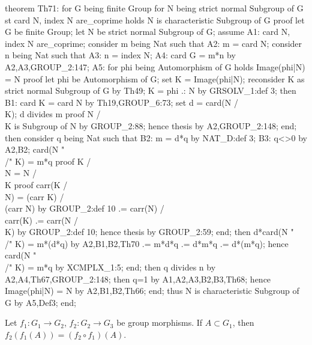 \nwenddocs{}\endmoddef\nwstartdeflinemarkup{}\nwenddeflinemarkup
theorem Th71:
  for G being finite Group
  for N being strict normal Subgroup of G
  st card N, index N are_coprime
  holds N is characteristic Subgroup of G
proof
  let G be finite Group;
  let N be strict normal Subgroup of G;
  assume A1: card N, index N are_coprime;
  consider m being Nat such that
  A2: m = card N;
  consider n being Nat such that
  A3: n = index N;
  A4: card G = m*n by A2,A3,GROUP_2:147;
  A5: for phi being Automorphism of G holds Image(phi|N) = N
  proof
    let phi be Automorphism of G;
    set K = Image(phi|N);
    reconsider K as strict normal Subgroup of G by Th49;
    K = phi .: N by GRSOLV_1:def 3;
    then B1: card K = card N by Th19,GROUP_6:73;
    set d = card(N /\\ K);
    d divides m
    proof
      N /\\ K is Subgroup of N by GROUP_2:88;
      hence thesis by A2,GROUP_2:148;
    end;
    then consider q being Nat such that
    B2: m = d*q by NAT_D:def 3;
    B3: q<>0 by A2,B2;
    card(N "\\/" K) = m*q
    proof
      K /\\ N = N /\\ K
      proof
        carr(K /\\ N) = (carr K) /\\ (carr N) by GROUP_2:def 10
                    .= carr(N) /\\ carr(K)
                    .= carr(N /\\ K) by GROUP_2:def 10;
        hence thesis by GROUP_2:59;
      end;
      then d*card(N "\\/" K) = m*(d*q) by A2,B1,B2,Th70
                           .= m*d*q
                           .= d*m*q
                           .= d*(m*q);
      hence card(N "\\/" K) = m*q by XCMPLX_1:5;
    end;
    then q divides n by A2,A4,Th67,GROUP_2:148;
    then q=1 by A1,A2,A3,B2,B3,Th68;
    hence Image(phi|N) = N by A2,B1,B2,Th66;
  end;
  thus N is characteristic Subgroup of G by A5,Def3;
end;
\eatline
{}\nwendcode{}\nwdocspar
\begin{theorem}
Let $f_{1}\colon G_{1}\to G_{2}$, $f_{2}\colon G_{2}\to G_{3}$ be group morphisms.
If $A\subset G_{1}$, then $f_{2}(f_{1}(A))=(f_{2}\circ f_{1})(A)$.
\end{theorem}

